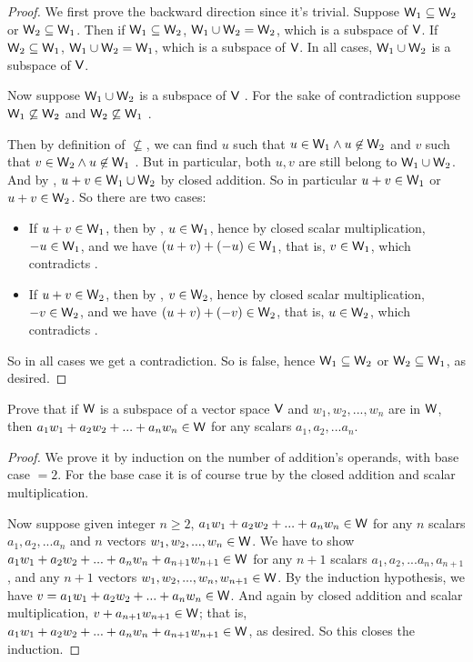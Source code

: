 \begin{proof}
We first prove the backward direction since it's trivial.
Suppose \(\textsf{W}_1 \subseteq \textsf{W}_2\) or \(\textsf{W}_2 \subseteq \textsf{W}_1\).
Then if \(\textsf{W}_1 \subseteq \textsf{W}_2\), \(\textsf{W}_1 \cup \textsf{W}_2 = \textsf{W}_2\), which is a subspace of \(\textsf{V}\).
If \(\textsf{W}_2 \subseteq \textsf{W}_1\), \(\textsf{W}_1 \cup \textsf{W}_2 = \textsf{W}_1\), which is a subspace of \(\textsf{V}\).
In all cases, \(\textsf{W}_1 \cup \textsf{W}_2\) is a subspace of \(\textsf{V}\).

Now suppose \(\textsf{W}_1 \cup \textsf{W}_2\) is a subspace of \(\textsf{V}\) .
For the sake of contradiction suppose \(\textsf{W}_1 \not \subseteq \textsf{W}_2\) and \(\textsf{W}_2 \not \subseteq \textsf{W}_1\) .

Then by definition of \(\not \subseteq\), we can find \(u\) such that \(u \in \textsf{W}_1 \land u \not \in \textsf{W}_2\)  and \(v\) such that \(v \in \textsf{W}_2 \land u \not \in \textsf{W}_1\) .
But in particular, both \(u, v\) are still belong to \(\textsf{W}_1 \cup \textsf{W}_2\).
And by , \(u + v \in \textsf{W}_1 \cup \textsf{W}_2\) by closed addition.
So in particular \(u + v \in \textsf{W}_1\) or \(u + v \in \textsf{W}_2\).
So there are two cases:
\begin{itemize}
    \item If \(u + v \in \textsf{W}_1\), then by , \(u \in \textsf{W}_1\), hence by closed scalar multiplication, \(-u \in \textsf{W}_1\), and we have \((u + v) + (-u) \in \textsf{W}_1\), that is, \(v \in \textsf{W}_1\), which contradicts .
    \item If \(u + v \in \textsf{W}_2\), then by , \(v \in \textsf{W}_2\), hence by closed scalar multiplication, \(-v \in \textsf{W}_2\), and we have \((u + v) + (-v) \in \textsf{W}_2\), that is, \(u \in \textsf{W}_2\), which contradicts .
\end{itemize}
So in all cases we get a contradiction.
So  is false, hence \(\textsf{W}_1 \subseteq \textsf{W}_2\) or \(\textsf{W}_2 \subseteq \textsf{W}_1\), as desired.
\end{proof}

\begin{exercise} \label{exercise 1.3.20}
Prove that if \(\textsf{W}\) is a subspace of a vector space \(\textsf{V}\) and \(w_1, w_2, ..., w_n\) are in \(\textsf{W}\), then \(a_1 w_1 + a_2 w_2 + ... + a_n w_n \in \textsf{W}\) for any scalars \(a_1, a_2, ... a_n\).
\end{exercise}

\begin{proof}
We prove it by induction on the number of addition's operands, with base case \(= 2\).
For the base case it is of course true by the closed addition and scalar multiplication.

Now suppose given integer \(n \ge 2\), \(a_1 w_1 + a_2 w_2 + ... + a_n w_n \in \textsf{W}\) for any \(n\) scalars \(a_1, a_2, ... a_n\) and \(n\) vectors \(w_1, w_2, ..., w_n \in \textsf{W}\).
We have to show \(a_1 w_1 + a_2 w_2 + ... + a_n w_n + a_{n + 1} w_{n + 1} \in \textsf{W}\) for any \(n + 1\) scalars \(a_1, a_2, ... a_n, a_{n + 1}\),
and any \(n + 1\) vectors \(w_1, w_2, ..., w_n, w_{n + 1} \in \textsf{W}\).
By the induction hypothesis, we have \(v = a_1 w_1 + a_2 w_2 + ... + a_n w_n \in \textsf{W}\).
And again by closed addition and scalar multiplication, \(v + a_{n + 1} w_{n + 1} \in \textsf{W}\);
that is, \(a_1 w_1 + a_2 w_2 + ... + a_n w_n + a_{n + 1} w_{n + 1} \in \textsf{W}\), as desired.
So this closes the induction.
\end{proof}

